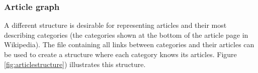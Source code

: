 \subsubsection{Article graph}
A different structure is desirable for representing articles and their most describing categories (the categories shown at the bottom of the article page in Wikipedia). The file containing all links between categories and their articles can be used to create a structure where each category knows its articles. Figure \ref{fig:articlestructure}) illustrates this structure. 

